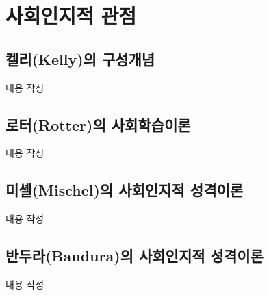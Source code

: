 \section{사회인지적 관점}

\subsection{켈리(Kelly)의 구성개념}
내용 작성

\subsection{로터(Rotter)의 사회학습이론}
내용 작성

\subsection{미셸(Mischel)의 사회인지적 성격이론}
내용 작성

\subsection{반두라(Bandura)의 사회인지적 성격이론}
내용 작성
